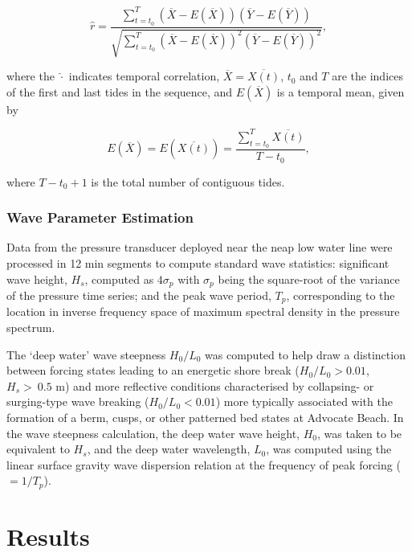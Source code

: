 \documentclass[jmse,article,submit,pdftex,moreauthors]{Definitions/mdpi}
\begin{document}
\begin{equation}\label{eq:pearsons_r_time}
\hat{r} = \frac{\sum_{t=t_0}^{T}(\overline{X} - E(\overline{X}))(\overline{Y}-E(\overline{Y}))}{\sqrt{\sum_{t=t_0}^{T}(\overline{X}-E(\overline{X}))^2 (\overline{Y}-E(\overline{Y}))^2}},
\end{equation}

\noindent where the $\hat{\cdot}$ indicates temporal correlation, $\overline{X}=\overline{X(t)}$, $t_0$ and $T$ are the indices of the first and last tides in the sequence, and $E(\overline{X})$ is a temporal mean, given by

\begin{equation}\label{eq:time_mean}
E(\overline{X}) = E(\overline{X(t)}) = \frac{\sum_{t=t_0}^{T} \overline{X(t)}}{T-t_0},
\end{equation}

\noindent where $T-t_0+1$ is the total number of contiguous tides.


\subsubsection{Wave Parameter Estimation}\label{Methods:Wavedata}

Data from the pressure transducer deployed near the neap low water line were processed in 12 min segments to compute standard wave statistics: significant wave height, $H_s$, computed as $4\sigma_p$ with $\sigma_p$ being the square-root of the variance of the pressure time series; and the peak wave period, $T_p$, corresponding to the location in inverse frequency space of maximum spectral density in the pressure spectrum. %

The `deep water' wave steepness $H_0/L_0$ was computed to help draw a distinction between forcing states leading to an energetic shore break ($H_0/L_0 > 0.01$, $H_s > ~0.5$ m) and more reflective conditions characterised by collapsing- or surging-type wave breaking ($H_0/L_0 < 0.01$) more typically associated with the formation of a berm, cusps, or other patterned bed states at Advocate Beach. In the wave steepness calculation, the deep water wave height, $H_0$, was taken to be equivalent to $H_s$, and the deep water wavelength, $L_0$, was computed using the linear surface gravity wave dispersion relation at the frequency of peak forcing ($=1/T_p$).


\section{Results}\label{Results}
\end{document}
